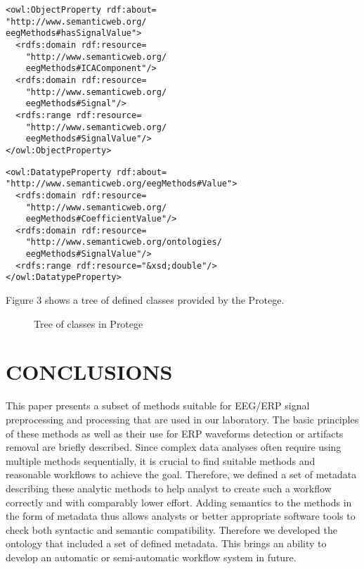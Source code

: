 \documentclass[a4paper,twoside]{article}
\begin{document}
\begin{small}
\begin{verbatim}
<owl:ObjectProperty rdf:about=
"http://www.semanticweb.org/
eegMethods#hasSignalValue">
  <rdfs:domain rdf:resource=
    "http://www.semanticweb.org/
    eegMethods#ICAComponent"/>
  <rdfs:domain rdf:resource=
    "http://www.semanticweb.org/
    eegMethods#Signal"/>
  <rdfs:range rdf:resource=
    "http://www.semanticweb.org/
    eegMethods#SignalValue"/>
</owl:ObjectProperty>
\end{verbatim}
\end{small}

\begin{small}
\begin{verbatim}
<owl:DatatypeProperty rdf:about=
"http://www.semanticweb.org/eegMethods#Value">
  <rdfs:domain rdf:resource=
    "http://www.semanticweb.org/
    eegMethods#CoefficientValue"/>
  <rdfs:domain rdf:resource=
    "http://www.semanticweb.org/ontologies/
    eegMethods#SignalValue"/>
  <rdfs:range rdf:resource="&xsd;double"/>
</owl:DatatypeProperty>
\end{verbatim}
\end{small}

\noindent Figure 3 shows a tree of defined classes provided by the Protege.

\begin{figure}[!h]

  \centering
   {}
  \caption{Tree of classes in Protege}
  \label{fig:classTree}
 \end{figure}

\section{\uppercase{Conclusions}}
\label{sec:conclusion}

\noindent This paper presents a subset of methods suitable for EEG/ERP signal preprocessing and processing that are used in our laboratory. The basic principles of these methods as well as their use for ERP waveforms detection or artifacts removal are briefly described. Since complex data analyses often require using multiple methods sequentially, it is crucial to find suitable methods and reasonable workflows to achieve the goal. Therefore, we defined a set of metadata describing these analytic methods to help analyst to create such a workflow correctly and with comparably lower effort. Adding semantics to the methods in the form of metadata thus allows analysts or better appropriate software tools to check both syntactic and semantic compatibility. Therefore we developed the ontology that included a set of defined metadata. This brings an ability to develop an automatic or semi-automatic workflow system in future.
\end{document}
